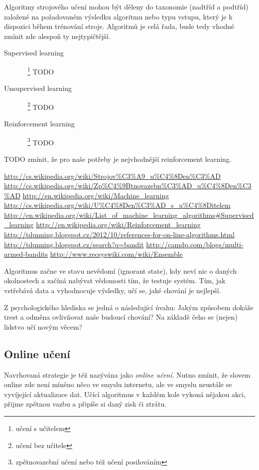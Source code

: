 \documentclass[thesis=M,czech]{FITthesis}[2014/05/07]
\begin{document}
Algoritmy strojového učení mohou být děleny do taxonomie (nadtříd a podtříd) založené na požadovaném výsledku algoritmu nebo typu vstupu, který je k dispozici během trénování stroje. Algoritmů je celá řada, bude tedy vhodné zmínit zde alespoň ty nejtypičtější. 

\begin{description}
  \item[Supervised learning]~\footnote{učení s učitelem} TODO
  \item[Unsupervised learning]~\footnote{učení bez učitele} TODO
  \item[Reinforcement learning]~\footnote{zpětnovazební učení nebo též učení posilováním} TODO
\end{description}

TODO zmínit, že pro naše potřeby je nejvhodnější reinforcement learning.

\url{http://cs.wikipedia.org/wiki/Strojov%C3%A9_u%C4%8Den%C3%AD}
\url{http://cs.wikipedia.org/wiki/Zp%C4%9Btnovazebn%C3%AD_u%C4%8Den%C3%AD}
\url{http://en.wikipedia.org/wiki/Machine_learning}
\url{http://cs.wikipedia.org/wiki/U%C4%8Den%C3%AD_s_u%C4%8Ditelem}
\url{http://en.wikipedia.org/wiki/List_of_machine_learning_algorithms#Supervised_learning}
\url{http://en.wikipedia.org/wiki/Reinforcement_learning}
\url{http://tdunning.blogspot.cz/2012/10/references-for-on-line-algorithms.html}
\url{http://tdunning.blogspot.cz/search?q=bandit}
\url{http://camdp.com/blogs/multi-armed-bandits}
\url{http://www.recsyswiki.com/wiki/Ensemble}

Algoritmus začne ve stavu nevědomí (ignorant state), kdy neví nic o daných okolnostech a začíná nabývat vědomosti tím, že testuje systém. Tím, jak vstřebává data a vyhodnocuje výsledky, učí se, jaké chování je nejlepší.

Z psychologického hlediska se jedná o následující úvahu: Jakým způsobem dokáže trest a odměna ovlivňovat naše budoucí chování? Na základě čeho se (nejen) lidstvo učí novým věcem?

\subsection{Online učení}

Navrhovaná strategie je též nazývána jako \emph{online učení}. Nutno zmínit, že slovem online zde není míněno něco ve smyslu internetu, ale ve smyslu neustále se vyvíjející aktualizace dat. Učící algoritmus v každém kole vykoná nějakou akci, přijme zpětnou vazbu a připíše si daný zisk či ztrátu.
\end{document}
